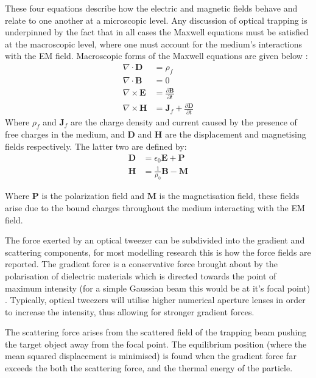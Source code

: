 These four equations describe how the electric and magnetic fields behave
and relate to one another at a microscopic level. Any discussion 
of optical trapping is underpinned by the fact that in all cases the 
Maxwell equations must be satisfied at the macroscopic level, where 
one must account for the medium's interactions with the EM field. 
Macroscopic forms of the Maxwell equations are given below \cite{Jackson_1975}:
\begin{align}
	\nabla \cdot \mathbf{D}
	&= \rho_f
	\\
	\nabla \cdot \mathbf{B}
	&= 0
	\\
	\nabla \times \mathbf{E}
	&= \frac{\partial \mathbf{B}}{\partial t}
	\\
	\nabla \times \mathbf{H}
	&= \mathbf{J}_f +\frac{\partial \mathbf{D}}{\partial t}  
\end{align}
Where $\rho_f$ and $\mathbf{J}_f$ are the charge density and current 
caused by the presence of free charges in the medium, and $\mathbf{D}$ 
and $\mathbf{H}$ are the displacement and magnetising fields respectively. 
The latter two are defined by:
\begin{align}
	\nonumber
	\mathbf{D} &= \epsilon_0\mathbf{E}+\mathbf{P} 
	\\ 
	\nonumber
	\mathbf{H} &= \frac{1}{\mu_0}\mathbf{B}-\mathbf{M}
\end{align}

Where $\mathbf{P}$ is the polarization field and $\mathbf{M}$ is the 
magnetisation field, these fields arise due to the bound charges 
throughout the medium interacting with the EM field. 

The force exerted by an optical tweezer can be subdivided into the 
gradient and scattering components, for most modelling research this 
is how the force fields are reported. The gradient force is a conservative 
force brought about by the polarisation of dielectric materials which 
is directed towards the point of maximum intensity (for a simple Gaussian 
beam this would be at it's focal point) \cite{YasuhiroHarada1996}. 
Typically, optical tweezers will utilise higher numerical aperture lenses 
in order to increase the intensity, thus allowing for stronger 
gradient forces.

The scattering force arises from the scattered field of the trapping beam 
pushing the target object away from the focal point. The equilibrium position 
(where the mean squared displacement is minimised) is found when the 
gradient force far exceeds the both the scattering force, and the thermal 
energy of the particle. 

